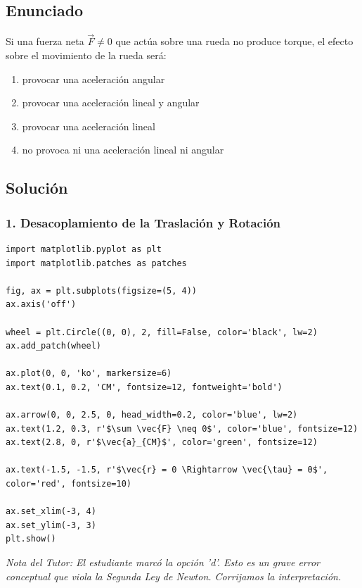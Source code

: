 \documentclass[12pt, a4paper]{article}
\begin{document}
\newpage

\subsection*{Enunciado}
Si una fuerza neta $\vec{F} \neq 0$ que actúa sobre una rueda no produce torque, el efecto sobre el movimiento de la rueda será:
\begin{enumerate}[label=\alph*)]
    \item provocar una aceleración angular
    \item provocar una aceleración lineal y angular
    \item provocar una aceleración lineal
    \item no provoca ni una aceleración lineal ni angular
\end{enumerate}

\subsection*{Solución}

\subsubsection*{1. Desacoplamiento de la Traslación y Rotación}

\begin{verbatim}
import matplotlib.pyplot as plt
import matplotlib.patches as patches

fig, ax = plt.subplots(figsize=(5, 4))
ax.axis('off')

wheel = plt.Circle((0, 0), 2, fill=False, color='black', lw=2)
ax.add_patch(wheel)

ax.plot(0, 0, 'ko', markersize=6)
ax.text(0.1, 0.2, 'CM', fontsize=12, fontweight='bold')

ax.arrow(0, 0, 2.5, 0, head_width=0.2, color='blue', lw=2)
ax.text(1.2, 0.3, r'$\sum \vec{F} \neq 0$', color='blue', fontsize=12)
ax.text(2.8, 0, r'$\vec{a}_{CM}$', color='green', fontsize=12)

ax.text(-1.5, -1.5, r'$\vec{r} = 0 \Rightarrow \vec{\tau} = 0$', color='red', fontsize=10)

ax.set_xlim(-3, 4)
ax.set_ylim(-3, 3)
plt.show()
\end{verbatim}

\textit{Nota del Tutor: El estudiante marcó la opción 'd'. Esto es un grave error conceptual que viola la Segunda Ley de Newton. Corrijamos la interpretación.}
\end{document}
